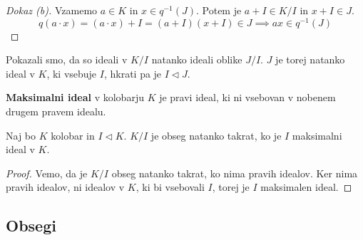 \documentclass[11pt, a4paper]{article}
\begin{document}
    \begin{proof}[Dokaz \emph{(b)}]
        Vzamemo \(a \in K\) in \(x \in q^{-1}(J)\). Potem je \(a+I \in K / I\) in \(x + I \in J\).
        \[q(a \cdot x) = (a \cdot x) + I = (a+I)(x+I) \in J \implies ax \in q^{-1}(J)\]
    \end{proof}

    Pokazali smo, da so ideali v \(K / I\) natanko ideali oblike \(J / I\). \(J\) je torej natanko ideal v \(K\), ki vsebuje \(I\), hkrati pa je \(I \triangleleft J\).

    \begin{definition}
        \textbf{Maksimalni ideal} v kolobarju \(K\) je pravi ideal, ki ni vsebovan v nobenem drugem pravem idealu.
    \end{definition}

    \begin{theorem}
        Naj bo \(K\) kolobar in \(I \triangleleft K\). \(K / I\) je obseg natanko takrat, ko je \(I\) maksimalni ideal v \(K\).
    \end{theorem}

    \begin{proof}
        Vemo, da je \(K / I\) obseg natanko takrat, ko nima pravih idealov. Ker nima pravih idealov, ni idealov v \(K\), ki bi vsebovali \(I\), torej je \(I\) maksimalen ideal.
    \end{proof}





    \pagebreak
    \subsection{Obsegi}
\end{document}
